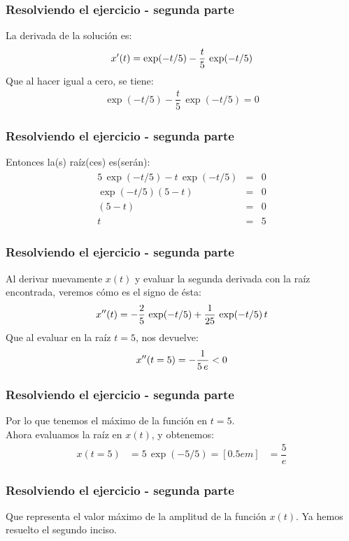 \begin{frame}
\frametitle{Resolviendo el ejercicio - segunda parte}
La derivada de la solución es:
\pause
\begin{align*}
{x}^{\prime}(t) = \exp(-t/5) - \dfrac{t}{5} \, \exp(-t/5) 
\end{align*}
\pause
Que al hacer igual a cero, se tiene:
\pause
\begin{align*}
\exp(-t/5) - \dfrac{t}{5} \, \exp(-t/5) = 0
\end{align*}
\end{frame}
\begin{frame}
\frametitle{Resolviendo el ejercicio - segunda parte}
Entonces la(s) raíz(ces) es(serán):
\pause
\begin{eqnarray*}
\begin{aligned}
5 \, \exp(-t/5) - t \, \exp(-t/5) &=& 0  \\[0.5em] 
\exp(-t/5) (5 - t) &=& 0 \\[0.5em] 
(5 - t) &=& 0 \\[0.5em] 
t &=& 5
\end{aligned}
\end{eqnarray*}
\end{frame}
\begin{frame}
\frametitle{Resolviendo el ejercicio - segunda parte}
Al derivar nuevamente $x(t)$ y evaluar la segunda derivada con la raíz encontrada, veremos cómo es el signo de ésta:
\pause
\begin{align*}
{x}^{\prime \prime}(t) = -\dfrac{2}{5} \, \exp(-t/5) + \dfrac{1}{25} \, \exp(-t/5) \, t
\end{align*}
\pause
Que al evaluar en la raíz $t = 5$, nos devuelve: 
\pause
\begin{align*}
{x}^{\prime \prime}(t=5) = - \dfrac{1}{5 \, e} < 0
\end{align*}
\end{frame}
\begin{frame}
\frametitle{Resolviendo el ejercicio - segunda parte}
Por lo que tenemos el máximo de la función en $t = 5$.
\\
\bigskip
\pause
Ahora evaluamos la raíz en $x(t)$, y obtenemos:
\pause
\begin{align*}
x(t=5) &= 5 \, \exp (-5/5) = [0.5em]
&= \dfrac{5}{e}
\end{align*}
\end{frame}
\begin{frame}
\frametitle{Resolviendo el ejercicio - segunda parte}
Que representa el valor máximo de la amplitud de la función $x(t)$. \pause Ya hemos resuelto el segundo inciso.
\end{frame}

